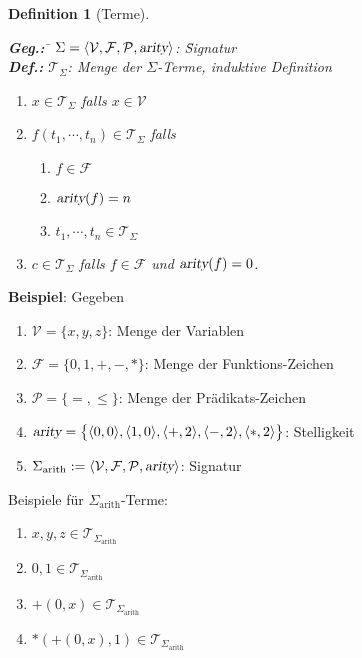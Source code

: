 \documentclass{article}
\newcommand{\el}{\!\in\!}
\def\pair(#1,#2){\langle #1, #2 \rangle}
\newtheorem{Definition}{Definition}
\begin{document}
\begin{Definition}[Terme] \hspace*{\fill} \\[-0.5cm]
  \begin{tabbing}
  \qquad \= \textbf{Geg.:} \quad \= $\Sigma = \langle \mathcal{V}, \mathcal{F}, \mathcal{P}, \textsl{arity}\rangle$: \quad \= Signatur \\[0.1cm]
         \> \textbf{Def.:}       \> $\mathcal{T}_\Sigma$:  \> Menge der $\Sigma$-Terme, induktive Definition    
  \end{tabbing}
  \begin{enumerate}
  \item $x \el \mathcal{T}_\Sigma$ falls $x \in \mathcal{V}$
  \item $f(t_1,\cdots,t_n) \el \mathcal{T}_\Sigma$ \quad falls
    \begin{enumerate}
    \item $f \in \mathcal{F}$ 
    \item $\textsl{arity}(f) = n$
    \item $t_1,\cdots,t_n \el \mathcal{T}_\Sigma$
    \end{enumerate}
  \item $c \el \mathcal{T}_\Sigma$ \quad falls $f \el \mathcal{F}$ und $\textsl{arity}(f) = 0$.
  \end{enumerate}
\end{Definition}

\noindent
\textbf{Beispiel}: Gegeben
\begin{enumerate}
\item $\mathcal{V} = \{ x, y, z \}$: \quad Menge der Variablen
\item $\mathcal{F} = \{ 0, 1, \mathtt{+}, \mathtt{-}, \mathtt{*} \}$: \quad Menge der Funktions-Zeichen
\item $\mathcal{P} = \{\mathtt{=}, \leq\}$: \quad  Menge der Pr\"{a}dikats-Zeichen    

\item   $\textsl{arity} = \bigl\{ \pair(0,0), \pair(1,0), \pair(\mathtt{+},2), \pair(\mathtt{-},2), \pair(\mathtt{*},2)
\bigr\}$: Stelligkeit
\item $\Sigma_\mathrm{arith} := \langle \mathcal{V}, \mathcal{F}, \mathcal{P}, \textsl{arity} \rangle$:
      \quad Signatur  
\end{enumerate}
Beispiele f\"{u}r $\Sigma_{\mathrm{arith}}$-Terme:
\begin{enumerate}
\item $x, y, z \in \mathcal{T}_{\Sigma_{\mathrm{arith}}}$
\item $0, 1 \in \mathcal{T}_{\Sigma_{\mathrm{arith}}}$
\item $\mathtt{+}(0,x) \in \mathcal{T}_{\Sigma_{\mathrm{arith}}}$
\item $\mathtt{*}(\mathtt{+}(0,x),1) \in \mathcal{T}_{\Sigma_{\mathrm{arith}}}$
\end{enumerate}
\end{document}
